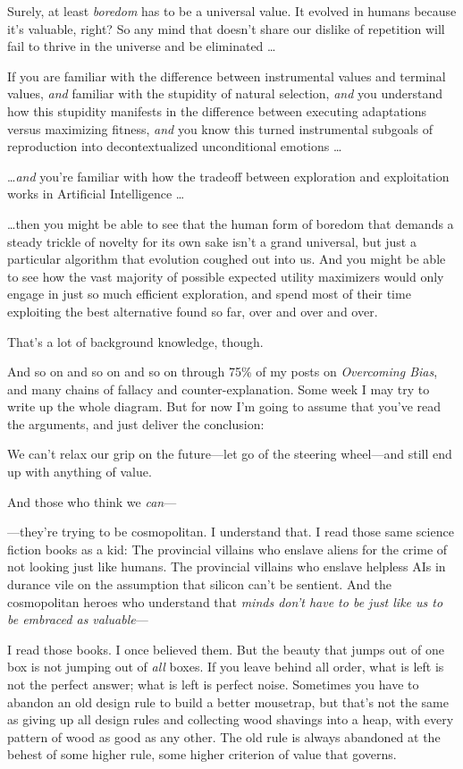 {
 Surely, at least \textit{boredom} has to be a universal value. It
evolved in humans because it's valuable, right? So any
mind that doesn't share our dislike of repetition will
fail to thrive in the universe and be eliminated \ldots}

{
 If you are familiar with the difference between instrumental
values and terminal values, \textit{and} familiar with the stupidity of
natural selection, \textit{and} you understand how this stupidity
manifests in the difference between executing adaptations versus
maximizing fitness, \textit{and} you know this turned instrumental
subgoals of reproduction into decontextualized unconditional emotions
\ldots}

{
 \ldots \textit{and} you're familiar with how the
tradeoff between exploration and exploitation works in Artificial
Intelligence \ldots}

{
 \ldots then you might be able to see that the human form of boredom
that demands a steady trickle of novelty for its own sake
isn't a grand universal, but just a particular
algorithm that evolution coughed out into us. And you might be able to
see how the vast majority of possible expected utility maximizers would
only engage in just so much efficient exploration, and spend most of
their time exploiting the best alternative found so far, over and over
and over.}

{
 That's a lot of background knowledge, though.}

{
 And so on and so on and so on through 75\% of my posts on
\textit{Overcoming Bias}, and many chains of fallacy and
counter-explanation. Some week I may try to write up the whole diagram.
But for now I'm going to assume that
you've read the arguments, and just deliver the
conclusion:}

{
 We can't relax our grip on the future---let go of
the steering wheel---and still end up with anything of value.}

{
 And those who think we \textit{can}{}---}

{
 {}---they're trying to be cosmopolitan. I
understand that. I read those same science fiction books as a kid: The
provincial villains who enslave aliens for the crime of not looking
just like humans. The provincial villains who enslave helpless AIs in
durance vile on the assumption that silicon can't be
sentient. And the cosmopolitan heroes who understand that \textit{minds
don't have to be just like us to be embraced as
valuable}{}---}

{
 I read those books. I once believed them. But the beauty that
jumps out of one box is not jumping out of \textit{all} boxes. If you
leave behind all order, what is left is not the perfect answer; what is
left is perfect noise. Sometimes you have to abandon an old design rule
to build a better mousetrap, but that's not the same as
giving up all design rules and collecting wood shavings into a heap,
with every pattern of wood as good as any other. The old rule is always
abandoned at the behest of some higher rule, some higher criterion of
value that governs.}

